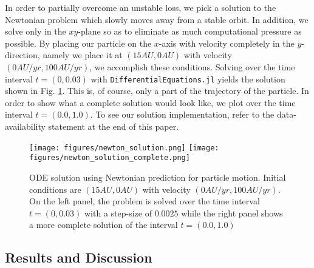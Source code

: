 \documentclass{CUP-JNL-DTM}%
\theoremstyle{definition}
\numberwithin{equation}{section}
\begin{document}
In order to partially overcome an unstable loss, we pick a solution to the Newtonian problem which slowly moves away from a stable orbit. In addition, we solve only in the $xy$-plane so as to eliminate as much computational pressure as possible. By placing our particle on the $x$-axis with velocity completely in the $y$-direction, namely we place it at $(15 \si{AU}, 0 \si{AU})$ with velocity $(0 \si{AU/yr}, 100 \si{AU/yr})$, we accomplish these conditions. Solving over the time interval $t = (0, 0.03)$ with \texttt{DifferentialEquations.jl} yields the solution shown in Fig. \ref{fig:newton_sol}. This is, of course, only a part of the trajectory of the particle. In order to show what a complete solution would look like, we plot over the time interval $t = (0.0, 1.0)$. To see our solution implementation, refer to the data-availability statement at the end of this paper. 

\begin{figure}
    \centering
    \texttt{[image: figures/newton\_solution.png]}
    \texttt{[image: figures/newton\_solution\_complete.png]}
    \caption{ODE solution using Newtonian prediction for particle motion. Initial conditions are $(15 \si{AU}, 0 \si{AU})$ with velocity $(0 \si{AU/yr}, 100 \si{AU/yr})$. On the left panel, the problem is solved over the time interval $t = (0, 0.03)$ with a step-size of $0.0025$ while the right panel shows a more complete solution of the interval $t = (0.0, 1.0)$}
    \label{fig:newton_sol}
\end{figure}

\subsection{Results and Discussion}
\end{document}
